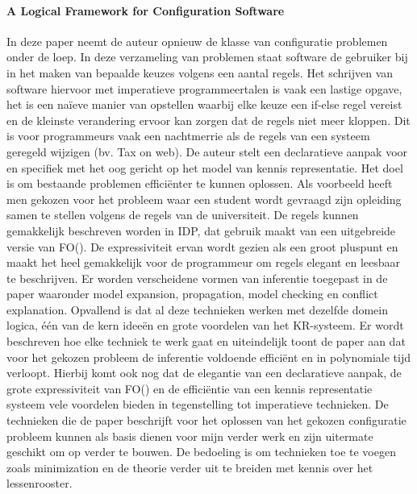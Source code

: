 \paragraph{A Logical Framework for Configuration Software \cite{vlaeminck09}}
In deze paper neemt de auteur opnieuw de klasse van configuratie problemen onder de loep. In deze verzameling van problemen staat software de gebruiker bij in het maken van bepaalde keuzes volgens een aantal regels. Het schrijven van software hiervoor met imperatieve programmeertalen is vaak een lastige opgave, het is een na\"{i}eve manier van opstellen waarbij elke keuze een if-else regel vereist en de kleinste verandering ervoor kan zorgen dat de regels niet meer kloppen. Dit is voor programmeurs vaak een nachtmerrie als de regels van een systeem geregeld wijzigen (bv. Tax on web). De auteur stelt een declaratieve aanpak voor en specifiek met het oog gericht op het model van kennis representatie. Het doel is om bestaande problemen effici\"{e}nter te kunnen oplossen. Als voorbeeld heeft men gekozen voor het probleem waar een student wordt gevraagd zijn opleiding samen te stellen volgens de regels van de universiteit. De regels kunnen gemakkelijk beschreven worden in IDP, dat gebruik maakt van een uitgebreide versie van FO(\textperiodcentered). De expressiviteit ervan wordt gezien als een groot pluspunt en maakt het heel gemakkelijk voor de programmeur om regels elegant en leesbaar te beschrijven. Er worden verscheidene vormen van inferentie toegepast in de paper waaronder model expansion, propagation, model checking en conflict explanation. Opvallend is dat al deze technieken werken met dezelfde domein logica, \'{e}\'{e}n van de kern idee\"{e}n en grote voordelen van het KR-systeem. Er wordt beschreven hoe elke techniek te werk gaat en uiteindelijk toont de paper aan dat voor het gekozen probleem de inferentie voldoende effici\"{e}nt en in polynomiale tijd verloopt. Hierbij komt ook nog dat de elegantie van een declaratieve aanpak, de grote expressiviteit van FO(\textperiodcentered) en de effici\"{e}ntie van een kennis representatie systeem vele voordelen bieden in tegenstelling tot imperatieve technieken. De technieken die de paper beschrijft voor het oplossen van het gekozen configuratie probleem kunnen als basis dienen voor mijn verder werk en zijn uitermate geschikt om op verder te bouwen. De bedoeling is om technieken toe te voegen zoals minimization en de theorie verder uit te breiden met kennis over het lessenrooster. 

